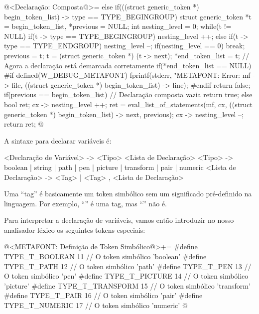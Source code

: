 \iniciocodigo
@<Declaração: Composta@>=
else if(((struct generic_token *) begin_token_list) -> type ==
        TYPE_BEGINGROUP){
  struct generic_token *t = begin_token_list, *previous = NULL;
  int nesting_level = 0;
  while(t != NULL){
    if(t -> type == TYPE_BEGINGROUP)
      nesting_level ++;
    else if(t -> type == TYPE_ENDGROUP){
      nesting_level --;
      if(nesting_level == 0)
        break;
    }
    previous = t;
    t = (struct generic_token *) (t -> next);
  }
  *end_token_list = t; // Agora a declaração está demarcada corretamente
  if(*end_token_list == NULL){
#if defined(W_DEBUG_METAFONT)
    fprintf(stderr, "METAFONT: Error: %
            mf -> file,
            ((struct generic_token *) begin_token_list) -> line);
#endif
    return false;
  }
  if(previous == begin_token_list) // Declaração composta vazia
    return true;
  else{
    bool ret;
    cx -> nesting_level ++;
    ret = eval_list_of_statements(mf, cx, ((struct generic_token *)
                                         begin_token_list) -> next,
                                  previous);
    cx -> nesting_level --;
    return ret;
  }
}
@
\fimcodigo


A sintaxe para declarar variáveis é:

\alinhaverbatim
<Declaração de Variável> -> <Tipo> <Lista de Declaração>
<Tipo> -> boolean | string | path | pen | picture | transform | pair |
          numeric
<Lista de Declaração> -> <Tag> | <Tag> , <Lista de Declaração>
\alinhanormal

Uma ``tag'' é basicamente um token simbólico sem um significado
pré-definido na linguagem. Por exemplo, ``'' é uma tag,
mas ``'' não é.

Para interpretar a declaração de variáveis, vamos então introduzir no
nosso analisador léxico os seguintes tokens especiais:

\iniciocodigo
@<METAFONT: Definição de Token Simbólico@>+=
#define TYPE_T_BOOLEAN               11 // O token simbólico 'boolean'
#define TYPE_T_PATH                  12 // O token simbólico 'path'
#define TYPE_T_PEN                   13 // O token simbólico 'pen'
#define TYPE_T_PICTURE               14 // O token simbólico 'picture'
#define TYPE_T_TRANSFORM             15 // O token simbólico 'transform'
#define TYPE_T_PAIR                  16 // O token simbólico 'pair'
#define TYPE_T_NUMERIC               17 // O token simbólico 'numeric'
@
\fimcodigo


